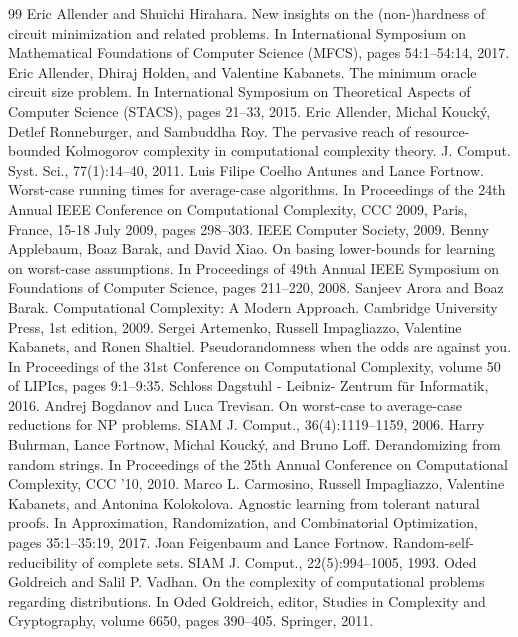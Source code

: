 \begin{thebibliography}{99}
 Eric Allender and Shuichi Hirahara. New insights on the (non-)hardness of circuit minimization and related problems. In International Symposium on Mathematical Foundations of Computer Science (MFCS), pages 54:1–54:14, 2017.
 Eric Allender, Dhiraj Holden, and Valentine Kabanets. The minimum oracle circuit size problem. In International Symposium on Theoretical Aspects of Computer Science (STACS), pages 21–33, 2015.
 Eric Allender, Michal Koucký, Detlef Ronneburger, and Sambuddha Roy. The pervasive reach of resource-bounded Kolmogorov complexity in computational complexity theory. J. Comput. Syst. Sci., 77(1):14–40, 2011.
 Luis Filipe Coelho Antunes and Lance Fortnow. Worst-case running times for average-case algorithms. In Proceedings of the 24th Annual IEEE Conference on Computational Complexity, CCC 2009, Paris, France, 15-18 July 2009, pages 298–303. IEEE Computer Society, 2009.
 Benny Applebaum, Boaz Barak, and David Xiao. On basing lower-bounds for learning on worst-case assumptions. In Proceedings of 49th Annual IEEE Symposium on Foundations of Computer Science, pages 211–220, 2008.
 Sanjeev Arora and Boaz Barak. Computational Complexity: A Modern Approach. Cambridge University Press, 1st edition, 2009.
 Sergei Artemenko, Russell Impagliazzo, Valentine Kabanets, and Ronen Shaltiel. Pseudorandomness when the odds are against you. In Proceedings of the 31st Conference on Computational Complexity, volume 50 of LIPIcs, pages 9:1–9:35. Schloss Dagstuhl - Leibniz- Zentrum für Informatik, 2016.
 Andrej Bogdanov and Luca Trevisan. On worst-case to average-case reductions for NP problems. SIAM J. Comput., 36(4):1119–1159, 2006.
 Harry Buhrman, Lance Fortnow, Michal Koucký, and Bruno Loff. Derandomizing from random strings. In Proceedings of the 25th Annual Conference on Computational Complexity, CCC ’10, 2010.
 Marco L. Carmosino, Russell Impagliazzo, Valentine Kabanets, and Antonina Kolokolova. Agnostic learning from tolerant natural proofs. In Approximation, Randomization, and Combinatorial Optimization, pages 35:1–35:19, 2017.
 Joan Feigenbaum and Lance Fortnow. Random-self-reducibility of complete sets. SIAM J. Comput., 22(5):994–1005, 1993.
 Oded Goldreich and Salil P. Vadhan. On the complexity of computational problems regarding distributions. In Oded Goldreich, editor, Studies in Complexity and Cryptography, volume 6650, pages 390–405. Springer, 2011.

\end{thebibliography}
